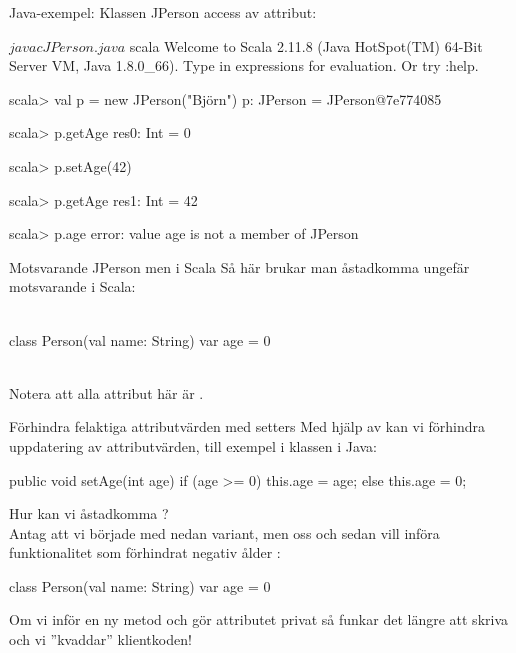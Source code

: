 \begin{Slide}{Java-exempel: Klassen JPerson}\SlideFontSmall
{} access av  attribut:
\vspace{-1em}\begin{multicols}{2}

\columnbreak

\begin{REPLnonum}[basicstyle=\SlideFontSize{7}{9}\ttfamily\color{white}]
$ javac JPerson.java
$ scala
Welcome to Scala 2.11.8 (Java HotSpot(TM) 64-Bit Server VM, Java 1.8.0_66).
Type in expressions for evaluation. Or try :help.

scala> val p = new JPerson("Björn")
p: JPerson = JPerson@7e774085

scala> p.getAge
res0: Int = 0

scala> p.setAge(42)

scala> p.getAge
res1: Int = 42

scala> p.age
error:
value age is not a member of JPerson
\end{REPLnonum}
\end{multicols}
\end{Slide}


\begin{Slide}{Motsvarande JPerson men i Scala}
Så här brukar man åstadkomma ungefär motsvarande i Scala: \\~
\begin{Code}[basicstyle=\SlideFontSize{13}{15}\ttfamily\selectfont]
class Person(val name: String) {
  var age = 0
}
\end{Code}
~\\
Notera att alla attribut här är .
\end{Slide}


\begin{Slide}{Förhindra felaktiga attributvärden med setters}\SlideFontSmall
Med hjälp av  kan vi förhindra  uppdatering av attributvärden, till exempel  i klassen  i Java:
\begin{Code}[language=Java]
    public void setAge(int age){
        if (age >= 0) {
            this.age = age;
        } else {
            this.age = 0;
        }
    }
\end{Code}
Hur kan vi åstadkomma ? \\
\pause
Antag att vi började med nedan variant, men  oss och sedan vill införa funktionalitet som förhindrat negativ ålder :
\begin{Code}
class Person(val name: String) {
  var age = 0
}
\end{Code}
Om vi inför en ny metod  och gör attributet  privat så funkar det  längre att skriva   och vi ''kvaddar'' klientkoden! \code{  :(}
\end{Slide}




